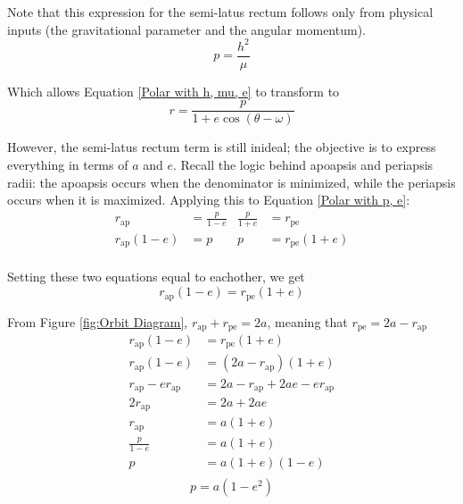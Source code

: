 \documentclass{article}
\begin{document}
Note that this expression for the semi-latus rectum follows only from physical inputs (the gravitational parameter and the angular momentum).
\begin{equation}\label{SLR h and mu}
    p=\frac{h^2}{\mu}
\end{equation}

Which allows Equation \eqref{Polar with h, mu, e} to transform to
\begin{equation}\label{Polar with p, e}
    r=\frac{p}{1+e\cos(\theta-\omega)}
\end{equation}

However, the semi-latus rectum term is still inideal; the objective is to express everything in terms of $a$ and $e$. Recall the logic behind apoapsis and periapsis radii: the apoapsis occurs when the denominator is minimized, while the periapsis occurs when it is maximized. Applying this to Equation \eqref{Polar with p, e}:
\begin{align*}
    r_\text{ap}      & =\frac{p}{1-e} & \frac{p}{1+e} & =r_\text{pe}      \\
    r_\text{ap}(1-e) & =p             & p             & =r_\text{pe}(1+e) \\
\end{align*}

Setting these two equations equal to eachother, we get
$$r_\text{ap}(1-e)=r_\text{pe}(1+e)$$

From Figure \ref{fig:Orbit Diagram}, $r_\text{ap}+r_\text{pe}=2a$, meaning that $r_\text{pe}=2a-r_\text{ap}$
\begin{align*}
    r_\text{ap}(1-e)         & =r_\text{pe}(1+e)                \\
    r_\text{ap}(1-e)         & =(2a-r_\text{ap})(1+e)           \\
    r_\text{ap}-er_\text{ap} & =2a-r_\text{ap}+2ae-er_\text{ap} \\
    2r_\text{ap}             & =2a+2ae                          \\
    r_\text{ap}              & =a(1+e)                          \\
    \frac{p}{1-e}            & =a(1+e)                          \\
    p                        & =a(1+e)(1-e)                     \\
\end{align*}
\begin{equation}\label{SLR a and e}
    p=a(1-e^2)
\end{equation}
\end{document}

